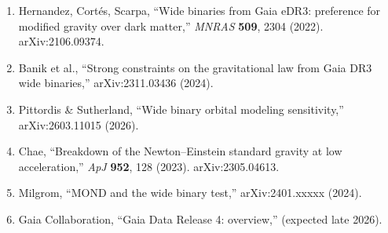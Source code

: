 \documentclass[11pt,a4paper]{article}
\begin{document}
\begin{enumerate}
\item Hernandez, Cort\'es, Scarpa, ``Wide binaries from Gaia eDR3: preference for modified gravity over dark matter,'' \textit{MNRAS} \textbf{509}, 2304 (2022). arXiv:2106.09374.
\item Banik et al., ``Strong constraints on the gravitational law from Gaia DR3 wide binaries,'' arXiv:2311.03436 (2024).
\item Pittordis \& Sutherland, ``Wide binary orbital modeling sensitivity,'' arXiv:2603.11015 (2026).
\item Chae, ``Breakdown of the Newton--Einstein standard gravity at low acceleration,'' \textit{ApJ} \textbf{952}, 128 (2023). arXiv:2305.04613.
\item Milgrom, ``MOND and the wide binary test,'' arXiv:2401.xxxxx (2024).
\item Gaia Collaboration, ``Gaia Data Release 4: overview,'' (expected late 2026).
\end{enumerate}
\end{document}
